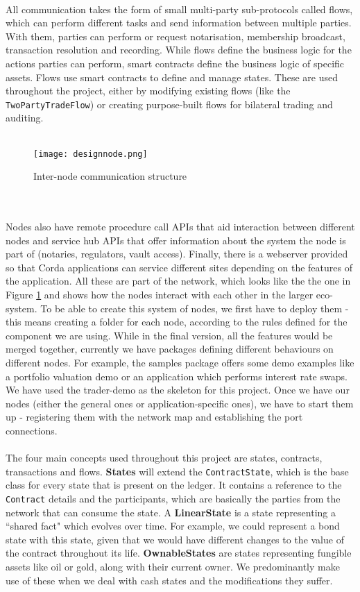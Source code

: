 \documentclass[12pt,twoside]{article}
\begin{document}
\\
All communication takes the form of small multi-party sub-protocols called flows, which can perform different tasks and send information between multiple parties. With them, parties can perform or request notarisation, membership broadcast, transaction resolution and recording. While flows define the business logic for the actions parties can perform, smart contracts define the business logic of specific assets. Flows use smart contracts to define and manage states. These are used throughout the project, either by modifying existing flows (like the \verb|TwoPartyTradeFlow|) or creating purpose-built flows for bilateral trading and auditing.
\\ \\
\begin{figure}[!htb]
\centering
\texttt{[image: designnode.png]}
\caption{Inter-node communication structure \cite{nodestruct}}
\centering
\label{fig:system}
\end{figure}
\\ \\
Nodes also have remote procedure call APIs that aid interaction between different nodes and service hub APIs that offer information about the system the node is part of (notaries, regulators, vault access). Finally, there is a webserver provided so that Corda applications can service different sites depending on the features of the application. All these are part of the network, which looks like the the one in Figure \ref{fig:system} and shows how the nodes interact with each other in the larger eco-system. To be able to create this system of nodes, we first have to deploy them - this means creating a folder for each node, according to the rules defined for the component we are using. While in the final version, all the features would be merged together, currently we have packages defining different behaviours on different nodes. For example, the samples package offers some demo examples like a portfolio valuation demo or an application which performs interest rate swaps. We have used the trader-demo as the skeleton for this project. Once we have our nodes (either the general ones or application-specific ones), we have to start them up - registering them with the network map and establishing the port connections.
\\ \\
The four main concepts used throughout this project are states, contracts, transactions and flows. \textbf{States} will extend the \verb|ContractState|, which is the base class for every state that is present on the ledger. It contains a reference to the \verb|Contract| details and the participants, which are basically the parties from the network that can consume the state. A \textbf{LinearState} is a state representing a ``shared fact" which evolves over time. For example, we could represent a bond state with this state, given that we would have different changes to the value of the contract throughout its life. \textbf{OwnableStates} are states representing fungible assets like oil or gold, along with their current owner. We predominantly make use of these when we deal with cash states and the modifications they suffer.
\end{document}

